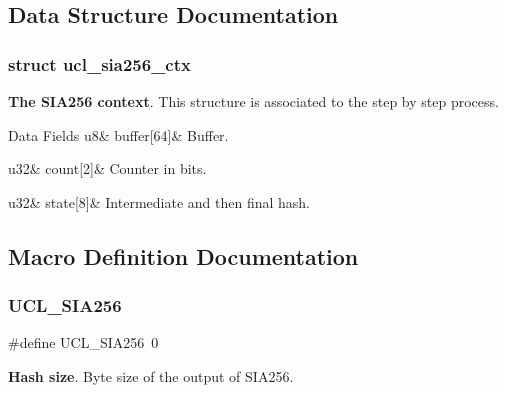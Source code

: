 \subsection{Data Structure Documentation}
\label{structucl__sia256__ctx}
\subsubsection{struct ucl\+\_\+sia256\+\_\+ctx}
{\bfseries The S\+I\+A256 context}. This structure is associated to the \textquotesingle{}step by step\textquotesingle{} process. \begin{DoxyFields}{Data Fields}
\mbox{\label{group___u_c_l___s_i_a256_a3aaaf77cfeea088172a742d19d1f9bcb}} 
u8&
buffer\mbox{[}64\mbox{]}&
Buffer. \\
\hline

\mbox{\label{group___u_c_l___s_i_a256_a9d40863406b2429b1f43c9b90cff5cf5}} 
u32&
count\mbox{[}2\mbox{]}&
Counter in bits. \\
\hline

\mbox{\label{group___u_c_l___s_i_a256_a7e2cf91d535966783b7d74bd0e891de9}} 
u32&
state\mbox{[}8\mbox{]}&
Intermediate and then final hash. \\
\hline

\end{DoxyFields}


\subsection{Macro Definition Documentation}
\mbox{\label{group___u_c_l___s_i_a256_gaea9532ac144a90f3ee34ae129ed68282}} 
\subsubsection{\texorpdfstring{U\+C\+L\+\_\+\+S\+I\+A256}{UCL\_SIA256}}
{\footnotesize\ttfamily \#define U\+C\+L\+\_\+\+S\+I\+A256~0}

{\bfseries Hash size}. Byte size of the output of S\+I\+A256. \mbox{\label{group___u_c_l___s_i_a256_ga34283058845b7379a0d481372e2ad4d9}} 
